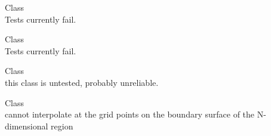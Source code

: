 \begin{DoxyRefList}
\item[Class \doxylink{class_quant_lib_1_1_interpolated_yo_y_optionlet_stripper}{Quant\+Lib\+::Interpolated\+Yo\+YOptionlet\+Stripper\texorpdfstring{$<$}{<} Interpolator1D \texorpdfstring{$>$}{>}} ]\hfill \\
\label{bug__bug000001}%
%
Tests currently fail.  
\item[Class \doxylink{class_quant_lib_1_1_k_interpolated_yo_y_optionlet_volatility_surface}{Quant\+Lib\+::KInterpolated\+Yo\+YOptionlet\+Volatility\+Surface\texorpdfstring{$<$}{<} Interpolator1D \texorpdfstring{$>$}{>}} ]\hfill \\
\label{bug__bug000002}%
%
Tests currently fail.  
\item[Class \doxylink{class_quant_lib_1_1_local_vol_surface}{Quant\+Lib\+::Local\+Vol\+Surface} ]\hfill \\
\label{bug__bug000011}%
%
this class is untested, probably unreliable.  
\item[Class \doxylink{class_quant_lib_1_1_multi_cubic_spline}{Quant\+Lib\+::Multi\+Cubic\+Spline\texorpdfstring{$<$}{<} i \texorpdfstring{$>$}{>}} ]\hfill \\
\label{bug__bug000004}%
%
cannot interpolate at the grid points on the boundary surface of the N-\/dimensional region 
\end{DoxyRefList}